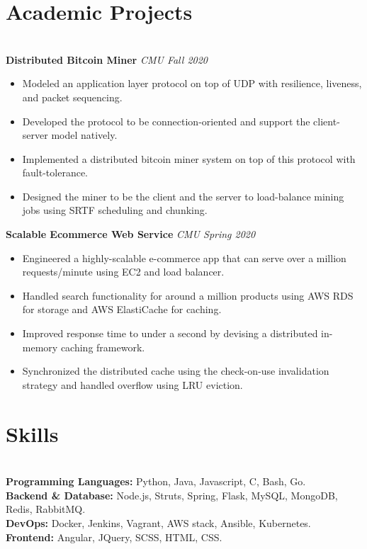 \documentclass{resume}
\begin{document}

\section*{Academic Projects}
\titlerule[0.2pt]
\noindent
\\
\textbf{Distributed Bitcoin Miner} \hfill \textit{CMU Fall 2020}
\begin{itemize}
  \item Modeled an application layer protocol on top of UDP with resilience, liveness, and packet sequencing.
  \item Developed the protocol to be connection-oriented and support the client-server model natively.
  \item Implemented a distributed bitcoin miner system on top of this protocol with fault-tolerance.
  \item Designed the miner to be the client and the server to load-balance mining jobs using SRTF scheduling and chunking.
\end{itemize}
\textbf{Scalable Ecommerce Web Service} \hfill \textit{CMU Spring 2020}
\begin{itemize}
  \item Engineered a highly-scalable e-commerce app that can serve over a million requests/minute using EC2 and load balancer.
  \item Handled search functionality for around a million products using AWS RDS for storage and AWS ElastiCache for caching.
  \item Improved response time to under a second by devising a distributed in-memory caching framework.
  \item Synchronized the distributed cache using the check-on-use invalidation strategy and handled overflow using LRU eviction.
\end{itemize}
\section*{Skills}
\titlerule[0.2pt]
\noindent
\\
\textbf{Programming Languages:} Python, Java, Javascript, C, Bash, Go. \\
\textbf{Backend \& Database:} Node.js, Struts, Spring, Flask, MySQL, MongoDB, Redis, RabbitMQ. \\
\textbf{DevOps:} Docker, Jenkins, Vagrant, AWS stack, Ansible, Kubernetes. \\
\textbf{Frontend:} Angular, JQuery, SCSS, HTML, CSS.

\end{document}
